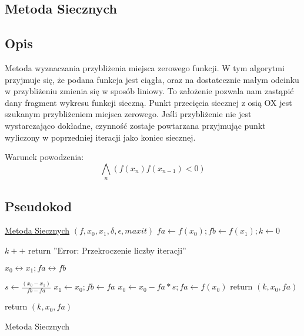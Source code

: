 \documentclass[11pt, a4paper]{article}
\begin{document}
    \subsection{Metoda Siecznych}
    \subsection{Opis}
    Metoda wyznaczania przybliżenia miejsca zerowego funkcji. W tym algorytmi przyjmuje się, że podana funkcja jest ciągła, oraz na dostatecznie małym odcinku w przybliżeniu zmienia się w sposób liniowy. To założenie pozwala nam zastąpić dany fragment wykresu funkcji sieczną. Punkt przecięcia siecznej z osią OX jest szukanym przybliżeniem miejsca zerowego. Jeśli przybliżenie nie jest wystarczająco dokładne, czynność zostaje powtarzana przyjmując punkt wyliczony w poprzedniej iteracji jako koniec siecznej.
    
    Warunek powodzenia:\\
    
    $$\bigwedge_{n} (f(x_{n})f(x_{n-1}) < 0) $$
    
    \subsection{Pseudokod}
    \begin{algorithm}[H]

        \underline{Metoda Siecznych} $(f, x_{0},x_{1}, \delta,\epsilon, maxit)$\;
        $fa \leftarrow f(x_{0}); fb \leftarrow f(x_{1}); k \leftarrow 0$\;
        {
            $k++$\;
            {
                return ''Error: Przekroczenie liczby iteracji''\;
            }

            {
                $x_{0} \leftrightarrow x_{1}; fa \leftrightarrow fb$\;
            }

            $s \leftarrow \frac{(x_{0} - x_{1})}{fb - fa}$\;
            $x_{1} \leftarrow x_{0}; fb \leftarrow fa$\;
            $x_{0} \leftarrow x_{0} - fa*s; fa \leftarrow f(x_{0})$\;
            {
                return $(k, x_{0}, fa)$\;
            }
        }
        return $(k, x_{0}, fa)$\;
        \caption{Metoda Siecznych}
    \end{algorithm}
\end{document}
